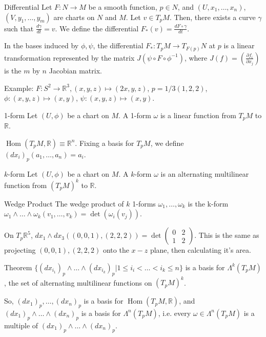 \documentclass[9pt]{beamer}
\DeclareMathOperator{\Hom}{Hom}
\DeclareMathOperator{\Det}{det}
\begin{document}
\begin{frame}{}
    \begin{block}{Differential}
        Let $F: N \rightarrow M$ be a smooth function, $p\in N$, and $(U, x_1,\dots,x_n)$, $(V, y_1,\dots,y_m)$ are charts on $N$ and $M$. Let $v\in T_pM$. Then, there exists a curve $\gamma$ such that $\frac{d \gamma}{d t} = v$. We define the differential $F_*(v)=\frac{d F\circ\gamma}{d t}$.
    \end{block}    

    In the bases induced by $\phi, \psi$, the differential $F_*:T_pM \rightarrow T_{F(p)}N$ at $p$ is a linear transformation represented by the matrix $J(\psi\circ F\circ \phi^{-1})$, where $J(f)=\left(\frac{\partial f_i}{\partial x_j}\right)$ is the $m$ by $n$ Jacobian matrix.
    

    Example: $F:S^2 \rightarrow \mathbb{R}^3, (x,y,z)\mapsto (2x,y,z)$, $p=1/3(1,2,2)$, $\phi:(x,y,z)\mapsto (x,y)$, $\psi:(x,y,z)\mapsto (x,y)$.
\end{frame}

\begin{frame}
    \begin{block}{1-form}
        Let $(U, \phi)$ be a chart on $M$. A 1-form $\omega$ is a linear function from $T_p M$ to $\mathbb{R}$.
    \end{block}
    $\Hom(T_p M, \mathbb{R})\equiv \mathbb{R}^n$. Fixing a basis for $T_pM$, we define $(dx_i)_p(a_1, \dots, a_n) = a_i$.
    \begin{block}{$k$-form}
        Let $(U, \phi)$ be a chart on $M$. A $k$-form $\omega$ is an alternating multilinear function from $(T_p M)^k$ to $\mathbb{R}$.
    \end{block}

\end{frame}

\begin{frame}
    \begin{block}{Wedge Product}
        The wedge product of $k$ 1-forms $\omega_1, \dots, \omega_k$ is the k-form $\omega_1\wedge\dots\wedge\omega_k(v_1, \dots, v_k)=\Det(\omega_i(v_j))$.
    \end{block}
    On $T_p\mathbb{R}^5$, $dx_1\wedge dx_3((0,0,1), (2,2,2))=\Det\begin{pmatrix} 0 & 2 \\
        1 & 2
    \end{pmatrix}$. This is the same as projecting $(0,0,1), (2,2,2)$ onto the $x-z$ plane, then calculating it's area.
    
    \begin{block}{Theorem}
        $\{(dx_{i_1})_p\wedge\dots\wedge (dx_{i_k})_p|1\leq i_i<\dots<i_k\leq n\}$ is a basis for $\Lambda^k(T_pM)$, the set of alternating multilinear functions on $(T_pM)^k$.
    \end{block}
    So, $(dx_1)_p, \dots, (dx_n)_p$ is a basis for $\Hom(T_p M, \mathbb{R})$, and $(dx_1)_p\wedge\dots\wedge (dx_n)_p$ is a basis for $\Lambda^n(T_pM)$, i.e. every $\omega\in\Lambda^n(T_pM)$ is a multiple of $(dx_1)_p\wedge\dots\wedge (dx_n)_p$.
\end{frame}
\end{document}
